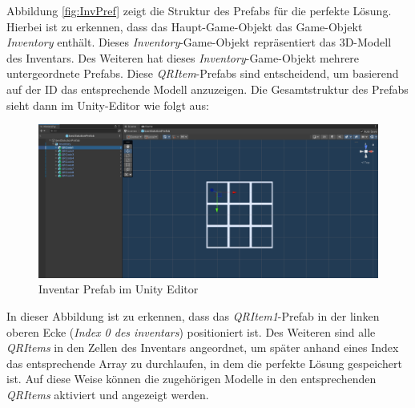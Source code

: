 Abbildung \ref{fig:InvPref} zeigt die Struktur des Prefabs für die perfekte Lösung. Hierbei ist zu erkennen, dass das
Haupt-Game-Objekt das Game-Objekt \textit{Inventory} enthält. Dieses \textit{Inventory}-Game-Objekt repräsentiert das
3D-Modell des Inventars. Des Weiteren hat dieses \textit{Inventory}-Game-Objekt mehrere untergeordnete Prefabs. Diese
\textit{QRItem}-Prefabs sind entscheidend, um basierend auf der ID das entsprechende Modell anzuzeigen. Die Gesamtstruktur
des Prefabs sieht dann im Unity-Editor wie folgt aus:
\begin{figure}[H]
    \centering
    \includegraphics[scale=0.3]{images/prefShow}
    \caption{Inventar Prefab im Unity Editor}
    \label{fig:InvPrefUn}
\end{figure}
In dieser Abbildung ist zu erkennen, dass das \textit{QRItem1}-Prefab in der linken oberen Ecke (\textit{Index 0 des inventars})
positioniert ist. Des Weiteren sind alle \textit{QRItems} in den Zellen des Inventars angeordnet, um später anhand eines
Index das entsprechende Array zu durchlaufen, in dem die perfekte Lösung gespeichert ist. Auf diese Weise können die
zugehörigen Modelle in den entsprechenden \textit{QRItems} aktiviert und angezeigt werden.

